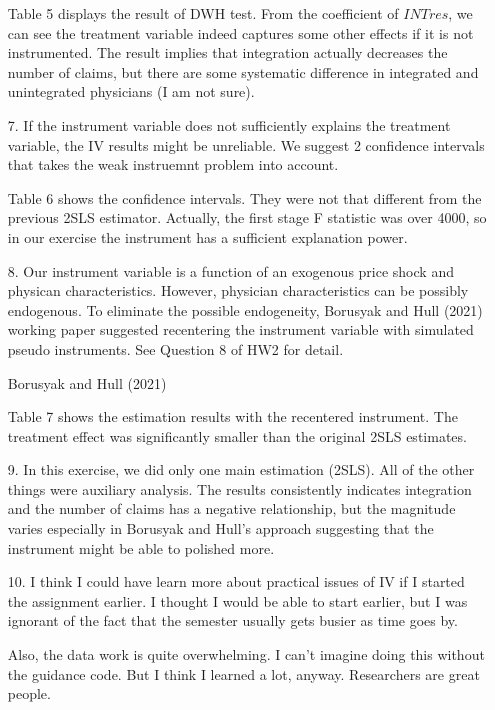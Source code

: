 \documentclass[12pt]{article}
\begin{document}
\begin{itemize}
    Table 5 displays the result of DWH test. From the coefficient of $INTres$, we can see the treatment variable indeed captures some other effects if it is not instrumented. The result implies that integration actually decreases the number of claims, but  there are some systematic difference in integrated and unintegrated physicians (I am not sure).
		
		\item[7.] If the instrument variable does not sufficiently explains the treatment variable, the IV results might be unreliable. We suggest 2 confidence intervals that takes the weak instruemnt problem into account.
		
		
		Table 6 shows the confidence intervals. They were not that different from the previous 2SLS estimator. Actually, the first stage F statistic was over 4000, so in our exercise the instrument has a sufficient explanation power.
			
		\item[8.] Our instrument variable is a function of an exogenous price shock and physican characteristics. However, physician characteristics can be possibly endogenous. To eliminate the possible endogeneity, Borusyak and Hull (2021) working paper suggested recentering the instrument variable with simulated pseudo instruments. See Question 8 of HW2 for detail.
		
		\begin{table}[ht]
    		
    		\caption{Borusyak and Hull (2021)}
		\end{table}

		Table 7 shows the estimation results with the recentered instrument. The treatment effect was significantly smaller than the original 2SLS estimates.

		\item[9.] In this exercise, we did only one main estimation (2SLS). All of the other things were auxiliary analysis. The results consistently indicates integration and the number of claims has a negative relationship, but the magnitude varies especially in Borusyak and Hull's approach suggesting that the instrument might be able to polished more.
		
		\item[10.] I think I could have learn more about practical issues of IV if I started the assignment earlier. I thought I would be able to start earlier, but I was ignorant of the fact that the semester usually gets busier as time goes by.
		
		Also, the data work is quite overwhelming. I can't imagine doing this without the guidance code. But I think I learned a lot, anyway. Researchers are great people.
		
	\end{itemize}
\end{document}
